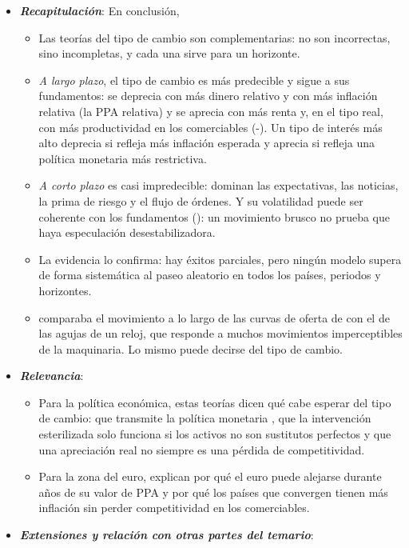 \documentclass[11pt]{article}
\begin{document}
\begin{itemize}
\item \textbf{\emph{Recapitulación}}: En conclusión,
  \begin{itemize}
  \item Las teorías del tipo de cambio son complementarias: no son incorrectas, sino incompletas, y cada una sirve para un horizonte.
  \item \emph{A largo plazo}, el tipo de cambio es más predecible y sigue a sus fundamentos: se deprecia con más dinero relativo y con más inflación relativa (la PPA relativa) y se aprecia con más renta y, en el tipo real, con más productividad en los comerciables (-). Un tipo de interés más alto deprecia si refleja más inflación esperada y aprecia si refleja una política monetaria más restrictiva\nocite{Frankel1979Mark}.
  \item \emph{A corto plazo} es casi impredecible: dominan las expectativas, las noticias, la prima de riesgo y el flujo de órdenes. Y su volatilidad puede ser coherente con los fundamentos (): un movimiento brusco no prueba que haya especulación desestabilizadora.
  \item La evidencia lo confirma: hay éxitos parciales, pero ningún modelo supera de forma sistemática al paseo aleatorio en todos los países, periodos y horizontes\nocite{Rossi2013}.
  \item {} comparaba el movimiento a lo largo de las curvas de oferta de  con el de las agujas de un reloj, que responde a muchos movimientos imperceptibles de la maquinaria. Lo mismo puede decirse del tipo de cambio.
  \end{itemize}
\item \textbf{\emph{Relevancia}}:
  \begin{itemize}
  \item Para la política económica, estas teorías dicen qué cabe esperar del tipo de cambio: que transmite la política monetaria , que la intervención esterilizada solo funciona si los activos no son sustitutos perfectos  y que una apreciación real no siempre es una pérdida de competitividad.
  \item Para la zona del euro, explican por qué el euro puede alejarse durante años de su valor de PPA y por qué los países que convergen tienen más inflación sin perder competitividad en los comerciables.
  \end{itemize}
\item \textbf{\emph{Extensiones y relación con otras partes del temario}}:

\end{itemize}
\end{document}
